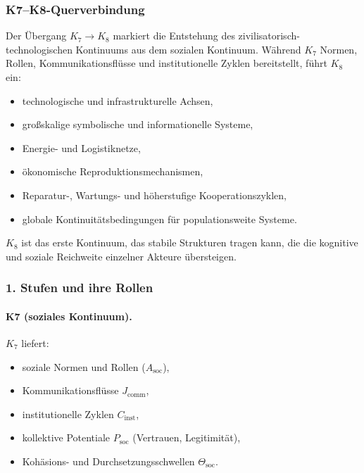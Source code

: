 
\subsubsection{K7–K8-Querverbindung}
\label{sec:crossk-k7-k8}

Der Übergang $K_7 \rightarrow K_8$ markiert die Entstehung des
zivilisatorisch-technologischen Kontinuums aus dem sozialen Kontinuum.
Während $K_7$ Normen, Rollen, Kommunikationsflüsse und institutionelle
Zyklen bereitstellt, führt $K_8$ ein:
\begin{itemize}
  \item technologische und infrastrukturelle Achsen,
  \item großskalige symbolische und informationelle Systeme,
  \item Energie- und Logistiknetze,
  \item ökonomische Reproduktionsmechanismen,
  \item Reparatur-, Wartungs- und höherstufige Kooperationszyklen,
  \item globale Kontinuitätsbedingungen für populationsweite Systeme.
\end{itemize}

$K_8$ ist das erste Kontinuum, das stabile Strukturen tragen kann, die
die kognitive und soziale Reichweite einzelner Akteure übersteigen.

\subsubsection{1. Stufen und ihre Rollen}

\paragraph{K7 (soziales Kontinuum).}
$K_7$ liefert:
\begin{itemize}
  \item soziale Normen und Rollen ($A_{\mathrm{soc}}$),
  \item Kommunikationsflüsse $J_{\mathrm{comm}}$,
  \item institutionelle Zyklen $C_{\mathrm{inst}}$,
  \item kollektive Potentiale $P_{\mathrm{soc}}$ (Vertrauen, Legitimität),
  \item Kohäsions- und Durchsetzungsschwellen $\Theta_{\mathrm{soc}}$.
\end{itemize}

